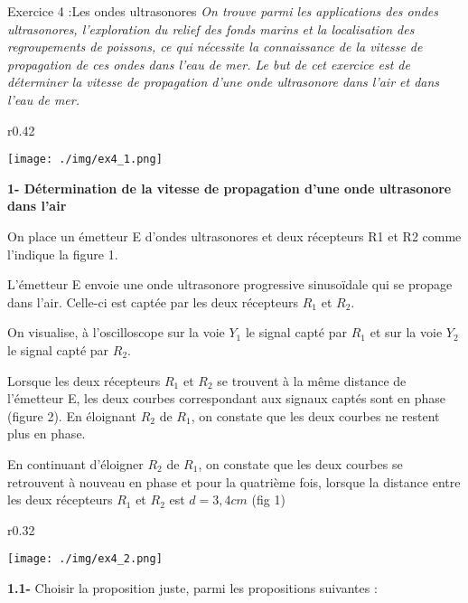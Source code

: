 \documentclass[12pt, french]{article}
\begin{document}
\begin{Box2}{Exercice 4 :Les ondes ultrasonores }
\emph{On trouve parmi les applications des ondes ultrasonores, l’exploration du relief des fonds marins et la
localisation des regroupements de poissons, ce qui nécessite la connaissance de la vitesse de
propagation de ces ondes dans l’eau de mer.
Le but de cet exercice est de déterminer la vitesse de propagation d’une onde ultrasonore dans l’air et
dans l’eau de mer.}

\begin{wrapfigure}{r}{0.42\textwidth}
  \begin{center}
	  \vspace{-0.6cm}
	\texttt{[image: ./img/ex4\_1.png]}
  \end{center}
\end{wrapfigure}


\textbf{1- Détermination de la vitesse de propagation d’une onde ultrasonore dans l’air\dotfill}

On place un émetteur E d’ondes ultrasonores et deux récepteurs R1 et R2 comme l’indique la figure 1.

L’émetteur E envoie une onde ultrasonore progressive sinusoïdale qui se propage dans l’air. Celle-ci est captée par les deux récepteurs $R_1$ et $R_2$.

On visualise, à l’oscilloscope sur la voie $Y_1$ le signal capté par $R_1$ et sur la voie $Y_2$ le signal capté par $R_2$.

Lorsque les deux récepteurs $R_1$ et $R_2$ se trouvent à la même distance de l’émetteur E, les deux courbes
correspondant aux signaux captés sont en phase (figure 2).
En éloignant $R_2$ de $R_1$, on constate que les deux courbes ne restent plus en phase.

En continuant d’éloigner $R_2$ de $R_1$, on constate que les deux
courbes se retrouvent à nouveau en phase et pour la
quatrième fois, lorsque la distance entre les deux récepteurs $R_1$ et $R_2$ est $d = 3,4 cm$ (fig 1)

\begin{wrapfigure}{r}{0.32\textwidth}
  \begin{center}
	  \vspace{-0.8cm}
	\texttt{[image: ./img/ex4\_2.png]}
  \end{center}
\end{wrapfigure}

\textbf{1.1- }Choisir la proposition juste, parmi les propositions
suivantes :


\end{Box2}
\end{document}
